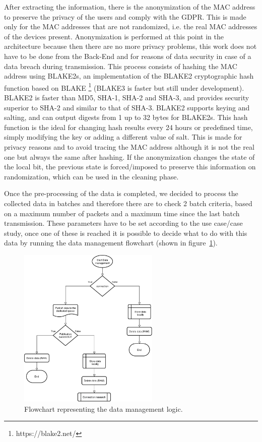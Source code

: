 After extracting the information, there is the anonymization of the MAC address to preserve the privacy of the users and comply with the GDPR. This is made only for the MAC addresses that are not randomized, i.e. the real MAC addresses of the devices present. Anonymization is performed at this point in the architecture because then there are no more privacy problems, this work does not have to be done from the Back-End and for reasons of data security in case of a data breach during transmission.
This process consists of hashing the MAC address using BLAKE2s, an implementation of the BLAKE2  cryptographic hash function based on BLAKE  \footnote{ https://blake2.net/ } (BLAKE3 is faster but still under development). BLAKE2 is faster than MD5, SHA-1, SHA-2 and SHA-3, and provides security superior to SHA-2 and similar to that of SHA-3. BLAKE2 supports keying and salting, and can output digests from 1 up to 32 bytes for BLAKE2s. This hash function is the ideal for changing hash results every 24 hours or predefined time, simply modifying the key or adding a different value of salt. This is made for privacy reasons and to avoid tracing the MAC address although it is not the real one but always the same after hashing.
If the anonymization changes the state of the local bit, the previous state is forced/imposed to preserve this information on randomization, which can be used in the cleaning phase.

Once the pre-processing of the data is completed, we decided to process the collected data in batches and therefore there are to check 2 batch criteria, based on a maximum number of packets and a maximum time since the last batch transmission. These parameters have to be set according to the use case/case study, once one of these is reached it is possible to decide what to do with this data by running the data management flowchart (shown in figure~\ref{fig:flowdata}).

\begin{figure}[h]
\centering 
\includegraphics[width=0.6\textwidth]{images/flowdata} 
\caption{Flowchart representing the data management logic.}
\label{fig:flowdata}
\end{figure}

